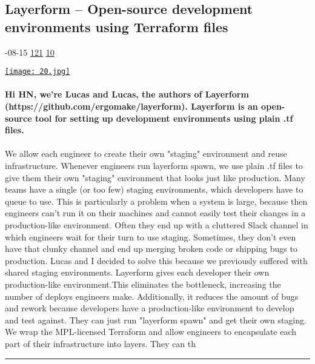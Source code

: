 \documentclass[10pt,a4paper]{article}
\begin{document}
\begin{multicols}{2}
\begin{minipage}{\linewidth}
\subsection{Layerform – Open-source development environments using Terraform files}
\textsc{\footnotesize
{\scriptsize\faCalendar}-08-15 
{\scriptsize\faThumbsOUp}\space 
\href{http://news.ycombinator.com/item?id=37133128\&utm\_term=comment}{121} 
{\scriptsize\faComments}\space 
\href{http://news.ycombinator.com/item?id=37133128\&utm\_term=comment}{10} 
}
\par\medskip\noindent
\href{https://news.ycombinator.com/item?id=37134293\&utm\_source=hackernewsletter\&utm\_medium=email\&utm\_term=show\_hn}{
    \texttt{[image: 20.jpg]}
}
\end{minipage}
\paragraph{}
\textbf{Hi HN, we're Lucas and Lucas, the authors of Layerform (https://github.com/ergomake/layerform). Layerform is an open-source tool for setting up development environments using plain .tf files.}
\paragraph{}
 We allow each engineer to create their own "staging" environment and reuse infrastructure.
Whenever engineers run layerform spawn, we use plain .tf files to give them their own "staging" environment that looks just like production.
Many teams have a single (or too few) staging environments, which developers have to queue to use. This is particularly a problem when a system is large, because then engineers can't run it on their machines and cannot easily test their changes in a production-like environment. Often they end up with a cluttered Slack channel in which engineers wait for their turn to use staging. Sometimes, they don't even have that clunky channel and end up merging broken code or shipping bugs to production. Lucas and I decided to solve this because we previously suffered with shared staging environments.
Layerform gives each developer their own production-like environment.This eliminates the bottleneck, increasing the number of deploys engineers make. Additionally, it reduces the amount of bugs and rework because developers have a production-like environment to develop and test against. They can just run "layerform spawn" and get their own staging.
We wrap the MPL-licensed Terraform and allow engineers to encapsulate each part of their infrastructure into layers. They can th
\par\noindent\textcolor{red}{\rule{\linewidth}{0.2mm}}
\vfill
\null
\end{multicols}
\end{document}
